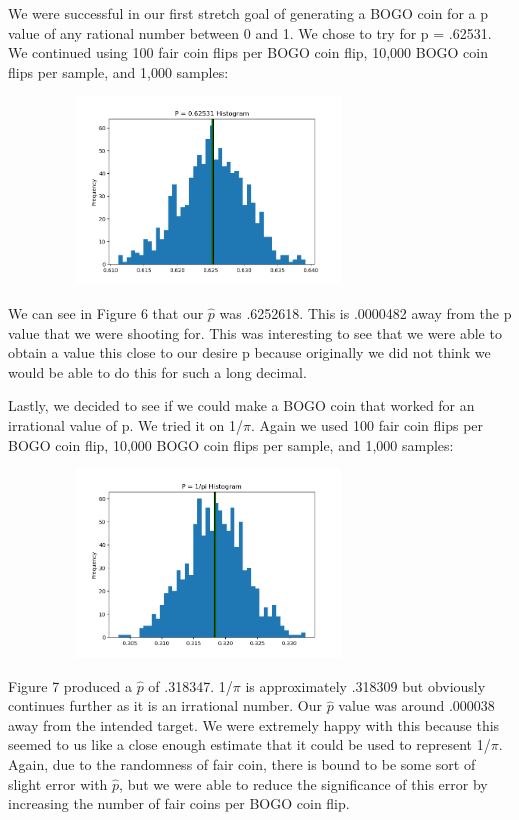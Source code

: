 \documentclass[11pt]{article}
\begin{document}
We were successful in our first stretch goal of generating a BOGO coin for a p value of any rational number 
between 0 and 1. We chose to try for p = .62531. We continued using 100 fair coin flips per BOGO coin flip, 
10,000 BOGO coin flips per sample, and 1,000 samples:

\begin{figure}[h]
    \caption
    \centering
    \includegraphics[width=8.5cm, height=5cm]{6253-100coins.png}
    \centering
\end{figure}

We can see in Figure 6 that our $\hat{p}$ was .6252618. This is .0000482 away from the p value
that we were shooting for. This was interesting to see that we were able to obtain a value this close
to our desire p because originally we did not think we would be able to do this for such a long decimal.

Lastly, we decided to see if we could make a BOGO coin that worked for an irrational value of p. We
tried it on 1/$\pi$. Again we used 100 fair coin flips per BOGO coin flip, 10,000 BOGO coin flips per sample, 
and 1,000 samples:

\begin{figure}[h]
    \caption
    \centering
    \includegraphics[width=8.5cm, height=5cm]{100coins.png}
    \centering
\end{figure}

\vspace{2cm}
Figure 7 produced a $\hat{p}$ of .318347. 1/$\pi$ is approximately .318309 but obviously continues further
as it is an irrational number. Our $\hat{p}$ value was around .000038 away from the intended target. We were
extremely happy with this because this seemed to us like a close enough estimate that it could be used to
represent 1/$\pi$. Again, due to the randomness of fair coin, there is bound to be some sort of slight
error with $\hat{p}$, but we were able to reduce the significance of this error by increasing the number
of fair coins per BOGO coin flip.
\end{document}
